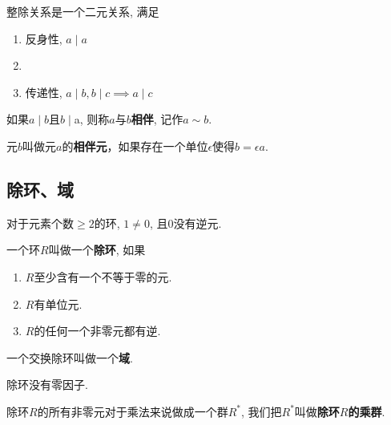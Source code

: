 \begin{Proposition}
整除关系是一个二元关系, 满足
\begin{enumerate}[(1)]
\item 反身性, $a \mid a$ 
\item {}
\item 传递性, $a \mid b, b \mid c \implies a \mid c$
\end{enumerate}
\end{Proposition}

\begin{Definition}[相伴]
如果$a \mid b$且$b \mid $a, 则称$a$与$b$\textbf{相伴}, 记作$a \sim b$. 
\end{Definition}

\begin{Definition}[相伴等价定义]
{元$b$叫做元$a$的\textbf{相伴元}，如果存在一个单位$\epsilon$使得$b = \epsilon a$}.
\end{Definition}

\subsection{除环、域} %

\begin{Proposition}
对于元素个数$\ge 2$的环, $\mathfrak{1} \neq \mathfrak{0}$, 且$\mathfrak{0}$没有逆元.
\end{Proposition}

\begin{Definition}[除环]
一个环$R$叫做一个\textbf{除环}, 如果
\begin{enumerate}
	\item $R$至少含有一个不等于零的元.
	\item $R$有单位元.
	\item $R$的任何一个非零元都有逆.
\end{enumerate}
\end{Definition}

\begin{Definition}[域]
一个交换除环叫做一个\textbf{域}.
\end{Definition}

\begin{Property}
除环没有零因子.
\end{Property}

\begin{Property}
除环$R$的所有非零元对于乘法来说做成一个群$R^*$, 我们把$R^*$叫做\textbf{除环$R$的乘群}.
\end{Property}

